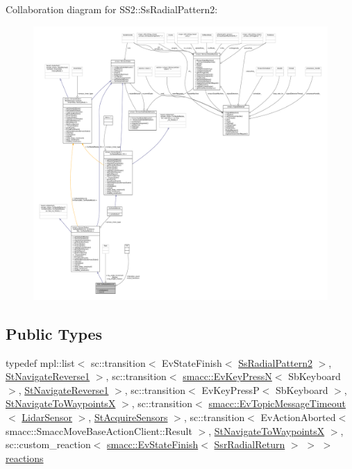 Collaboration diagram for S\+S2\+:\+:Ss\+Radial\+Pattern2\+:
\nopagebreak
\begin{figure}[H]
\begin{center}
\leavevmode
\includegraphics[width=350pt]{structSS2_1_1SsRadialPattern2__coll__graph}
\end{center}
\end{figure}
\subsection*{Public Types}
\begin{DoxyCompactItemize}
\item 
typedef mpl\+::list$<$ sc\+::transition$<$ Ev\+State\+Finish$<$ \hyperlink{structSS2_1_1SsRadialPattern2}{Ss\+Radial\+Pattern2} $>$, \hyperlink{structStNavigateReverse1}{St\+Navigate\+Reverse1} $>$, sc\+::transition$<$ \hyperlink{structsmacc_1_1EvKeyPressN}{smacc\+::\+Ev\+Key\+PressN}$<$ Sb\+Keyboard $>$, \hyperlink{structStNavigateReverse1}{St\+Navigate\+Reverse1} $>$, sc\+::transition$<$ Ev\+Key\+PressP$<$ Sb\+Keyboard $>$, \hyperlink{structStNavigateToWaypointsX}{St\+Navigate\+To\+WaypointsX} $>$, sc\+::transition$<$ \hyperlink{structsmacc_1_1EvTopicMessageTimeout}{smacc\+::\+Ev\+Topic\+Message\+Timeout}$<$ \hyperlink{sensor__state_8h_a9db9e1944f88de79507758d08e4a2ee3}{Lidar\+Sensor} $>$, \hyperlink{structStAcquireSensors}{St\+Acquire\+Sensors} $>$, sc\+::transition$<$ Ev\+Action\+Aborted$<$ smacc\+::\+Smacc\+Move\+Base\+Action\+Client\+::\+Result $>$, \hyperlink{structStNavigateToWaypointsX}{St\+Navigate\+To\+WaypointsX} $>$, sc\+::custom\+\_\+reaction$<$ \hyperlink{structsmacc_1_1EvStateFinish}{smacc\+::\+Ev\+State\+Finish}$<$ \hyperlink{structSsrRadialReturn}{Ssr\+Radial\+Return} $>$ $>$ $>$ \hyperlink{structSS2_1_1SsRadialPattern2_ac9aed91fb703d0e5b62f1dab80cde444}{reactions}
\end{DoxyCompactItemize}
